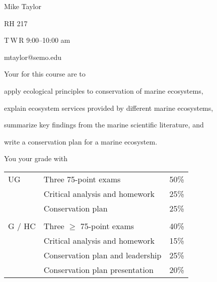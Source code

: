 \documentclass[t,handout]{beamer}  %
\begin{document}

{
\begin{frame}[t]
\end{frame}
}

{
\begin{frame}[t,plain]
\large
\vspace{5ex}

\hangpara Mike Taylor

\hangpara RH 217

\hangpara T\,W\,R 9:00--10:00 am

\hangpara mtaylor@semo.edu

\end{frame}
}

\begin{frame}[t]{Your  for this course are to}

	\hangpara apply ecological principles to conservation of marine ecosystems,

	\hangpara explain ecosystem services provided by different marine ecosystems, 

	\hangpara summarize key findings from the marine scientific literature, and
	
	\hangpara write a conservation plan for a marine ecosystem.
		
\end{frame}


\begin{frame}[t]{You  your grade with}
	\begin{center}\large\begin{tabular}{@{}lll@{}}
	UG		&	Three 75-point exams 			& 	50\% \\
			&	Critical analysis and homework 	& 	25\% \\
			&	Conservation plan 				& 	25\% \\
			&								&	\\
	G / HC	&	Three $\geq$ 75-point exams 		& 	40\% \\
			&	Critical analysis and homework 	& 	15\% \\
			&	Conservation plan and leadership 	&	25\% \\
			&	Conservation plan presentation 	&	20\% \\
	\end{tabular}
	\end{center}
\end{frame}
\end{document}
